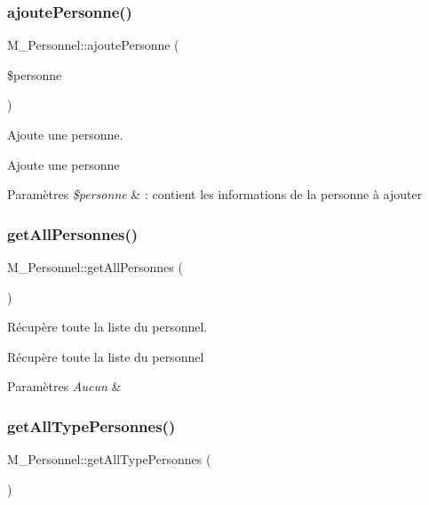 \subsubsection{\texorpdfstring{ajoute\+Personne()}{ajoutePersonne()}}
{\footnotesize\ttfamily M\+\_\+\+Personnel\+::ajoute\+Personne (\begin{DoxyParamCaption}\item[{}]{\$personne }\end{DoxyParamCaption})}



Ajoute une personne. 

Ajoute une personne 
\begin{DoxyParams}{Paramètres}
{\em \$personne} & \+: contient les informations de la personne à ajouter \\
\hline
\end{DoxyParams}
\mbox{\label{class_m___personnel_ab03a572f8f3d3d70971e5c1c57612904}} 
\subsubsection{\texorpdfstring{get\+All\+Personnes()}{getAllPersonnes()}}
{\footnotesize\ttfamily M\+\_\+\+Personnel\+::get\+All\+Personnes (\begin{DoxyParamCaption}{ }\end{DoxyParamCaption})}



Récupère toute la liste du personnel. 

Récupère toute la liste du personnel 
\begin{DoxyParams}{Paramètres}
{\em Aucun} & \\
\hline
\end{DoxyParams}
\mbox{\label{class_m___personnel_a67826be42806c168be64c8ca00676999}} 
\subsubsection{\texorpdfstring{get\+All\+Type\+Personnes()}{getAllTypePersonnes()}}
{\footnotesize\ttfamily M\+\_\+\+Personnel\+::get\+All\+Type\+Personnes (\begin{DoxyParamCaption}{ }\end{DoxyParamCaption})}



